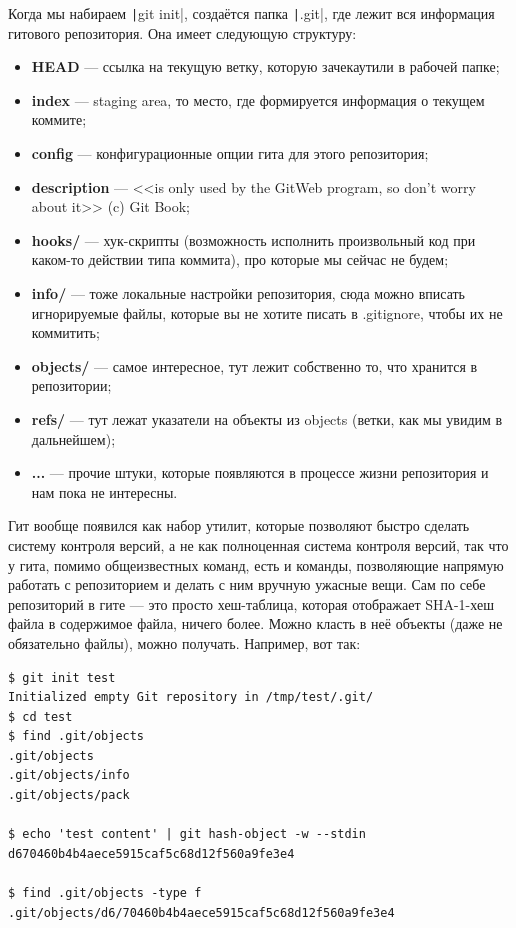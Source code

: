 \documentclass{../../text-style}
\begin{document}
Когда мы набираем \texttt|git init|, создаётся папка \texttt|.git|, где лежит вся информация гитового репозитория. Она имеет следующую структуру:

\begin{itemize}
    \item \textbf{HEAD} --- ссылка на текущую ветку, которую зачекаутили в рабочей папке;
    \item \textbf{index} --- staging area, то место, где формируется информация о текущем коммите;
    \item \textbf{config} --- конфигурационные опции гита для этого репозитория;
    \item \textbf{description} --- <<is only used by the GitWeb program, so don’t worry about it>> (c) Git Book;
    \item \textbf{hooks/} --- хук-скрипты (возможность исполнить произвольный код при каком-то действии типа коммита), про которые мы сейчас не будем;
    \item \textbf{info/} --- тоже локальные настройки репозитория, сюда можно вписать игнорируемые файлы, которые вы не хотите писать в .gitignore, чтобы их не коммитить;
    \item \textbf{objects/} --- самое интересное, тут лежит собственно то, что хранится в репозитории;
    \item \textbf{refs/} --- тут лежат указатели на объекты из objects (ветки, как мы увидим в дальнейшем);
    \item \textbf{...} --- прочие штуки, которые появляются в процессе жизни репозитория и нам пока не интересны.
\end{itemize}

Гит вообще появился как набор утилит, которые позволяют быстро сделать систему контроля версий, а не как полноценная система контроля версий, так что у гита, помимо общеизвестных команд, есть и команды, позволяющие напрямую работать с репозиторием и делать с ним вручную ужасные вещи. Сам по себе репозиторий в гите --- это просто хеш-таблица, которая отображает SHA-1-хеш файла в содержимое файла, ничего более. Можно класть в неё объекты (даже не обязательно файлы), можно получать. Например, вот так:

\begin{verbatim}
$ git init test
Initialized empty Git repository in /tmp/test/.git/
$ cd test
$ find .git/objects
.git/objects
.git/objects/info
.git/objects/pack

$ echo 'test content' | git hash-object -w --stdin
d670460b4b4aece5915caf5c68d12f560a9fe3e4

$ find .git/objects -type f
.git/objects/d6/70460b4b4aece5915caf5c68d12f560a9fe3e4
\end{verbatim}
\end{document}
